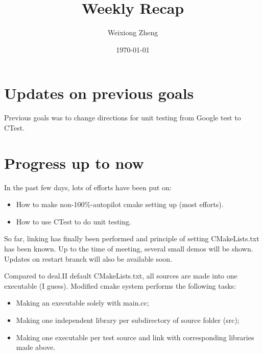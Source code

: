 \documentclass{article}
\title{Weekly Recap} %
\author{Weixiong Zheng} %
\date{\today} %
\begin{document}
\maketitle %

\section{Updates on previous goals}
Previous goals was to change directions for unit testing from Google test to CTest.

\section{Progress up to now}
In the past few days, lots of efforts have been put on:
\begin{itemize}
	\item How to make non-100\%-autopilot cmake setting up (most efforts).
	\item How to use CTest to do unit testing.
\end{itemize}

So far, linking has finally been performed and principle of setting CMakeLists.txt has been known. Up to the time of meeting, several small demos will be shown. Updates on restart branch will also be available soon.

Compared to deal.II default CMakeLists.txt, all sources are made into one executable (I guess). Modified cmake system performs the following tasks:
\begin{itemize}
	\item Making an executable solely with main.cc;
	\item Making one independent library per subdirectory of source folder (src);
	\item Making one executable per test source and link with corresponding libraries made above.
\end{itemize}
\end{document}
